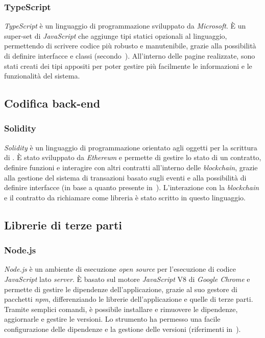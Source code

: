 \subsubsection{TypeScript}\label{subsubsec:typescript}
\textit{TypeScript} è un linguaggio di programmazione  sviluppato da \textit{Microsoft}. È un super-set di \textit{JavaScript} che aggiunge tipi statici opzionali al linguaggio,
permettendo di scrivere codice più robusto e manutenibile, grazie alla possibilità di definire interfacce e classi (secondo~\cite{site:react}).
All'interno delle pagine realizzate, sono stati creati dei tipi appositi per poter gestire più facilmente le informazioni e le funzionalità del sistema.

\subsection{Codifica back-end}\label{subsec:codice-back-end}

\subsubsection{Solidity}\label{subsubsec:solidity}
\textit{Solidity} è un linguaggio di programmazione orientato agli oggetti per la scrittura di . È stato sviluppato da \textit{Ethereum} e permette di gestire
lo stato di un contratto, definire funzioni e interagire con altri contratti all'interno delle \textit{blockchain},
grazie alla gestione del sistema di transazioni basato sugli eventi e alla possibilità di definire interfacce (in base a quanto presente in~\cite{site:solidity}).
L'interazione con la \textit{blockchain} e il contratto da richiamare come libreria è stato scritto in questo linguaggio.

\subsection{Librerie di terze parti}\label{subsec:librerie-terze-parti}

\subsubsection{Node.js}\label{subsubsec:nodejs}
\textit{Node.js} è un ambiente di esecuzione \textit{open source} per l'esecuzione di codice \textit{JavaScript} lato \textit{server}. È basato sul motore \textit{JavaScript} V8 di \textit{Google Chrome} e permette di gestire
le dipendenze dell'applicazione, grazie al suo gestore di pacchetti \textit{npm}, differenziando le librerie dell'applicazione e quelle di terze parti.
Tramite semplici comandi, è possibile installare e rimuovere le dipendenze, aggiornarle e gestire le versioni. 
Lo strumento ha permesso una facile configurazione delle dipendenze e la gestione delle versioni (riferimenti in~\cite{site:node}).

